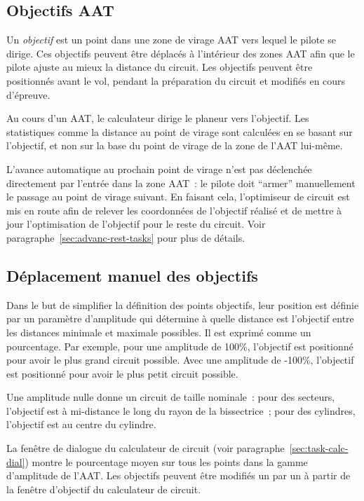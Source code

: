 \subsection*{Objectifs AAT}

Un \emph{objectif} est un point dans une zone de virage AAT vers lequel le pilote
se dirige. Ces objectifs peuvent être déplacés à l'intérieur des zones AAT afin
que le pilote ajuste au mieux la distance du circuit. Les objectifs peuvent être positionnés
avant le vol, pendant la préparation du circuit et modifiés en cours d'épreuve.

Au cours d'un AAT, le calculateur dirige le planeur vers l'objectif.
Les statistiques comme la distance au point de virage sont calculées en se basant sur
l'objectif, et non sur la base du point de virage de la zone de l'AAT lui-même.

L'avance automatique au prochain point de virage n'est pas déclenchée directement
par l'entrée dans la zone AAT~: le pilote doit ``armer'' manuellement le passage au point de virage
suivant. En faisant cela, l'optimiseur de circuit est mis en route afin de relever
les coordonnées de l'objectif réalisé et de mettre à jour l'optimisation
de l'objectif pour le reste du circuit. Voir paragraphe~\ref{sec:advanc-rest-tasks} pour plus de détails.

\subsection*{Déplacement manuel des objectifs}

Dans le but de simplifier la définition des points objectifs, 
leur position est définie par un paramètre d'amplitude qui détermine à quelle
distance est l'objectif entre les distances minimale et maximale possibles.  
Il est exprimé comme un pourcentage. Par exemple, pour une amplitude de 100\%,
l'objectif est positionné pour avoir le plus grand circuit possible. Avec une amplitude de -100\%, l'objectif est positionné pour avoir le plus petit circuit possible. 

Une amplitude nulle donne un circuit de taille nominale~:
pour des secteurs, l'objectif est
à mi-distance le long du rayon de la bissectrice~; pour des cylindres, l'objectif est au
centre du cylindre.

La fenêtre de dialogue du calculateur de circuit (voir paragraphe~\ref{sec:task-calc-dial}) montre
le pourcentage moyen sur tous les points dans la gamme d'amplitude de l'AAT.\@
Les objectifs peuvent être modifiés un par un à partir de la fenêtre d'objectif du calculateur de circuit.

